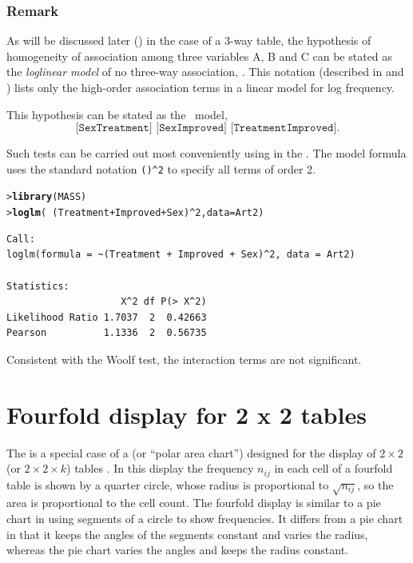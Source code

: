 \documentclass[10pt,krantz2]{krantz}\usepackage[]{graphicx}\usepackage[]{color}
\makeatletter
\newcommand{\hlnum}[1]{\textcolor[rgb]{0.686,0.059,0.569}{#1}}%
\newcommand{\hlopt}[1]{\textcolor[rgb]{0,0,0}{#1}}%
\newcommand{\hlstd}[1]{\textcolor[rgb]{0.345,0.345,0.345}{#1}}%
\newcommand{\hlkwc}[1]{\textcolor[rgb]{0.333,0.667,0.333}{#1}}%
\newcommand{\hlkwd}[1]{\textcolor[rgb]{0.737,0.353,0.396}{\textbf{#1}}}%
\newenvironment{kframe}{%
 \def\at@end@of@kframe{}%
 \ifinner\ifhmode%
  \def\at@end@of@kframe{\end{minipage}}%
  \begin{minipage}{\columnwidth}%
 \fi\fi%
 \def\FrameCommand##1{\hskip\@totalleftmargin \hskip-\fboxsep
 \colorbox{shadecolor}{##1}\hskip-\fboxsep
     \hskip-\linewidth \hskip-\@totalleftmargin \hskip\columnwidth}%
 \MakeFramed {\advance\hsize-\width
   \@totalleftmargin\z@ \linewidth\hsize
   \@setminipage}}%
 {\par\unskip\endMakeFramed%
 \at@end@of@kframe}
\newenvironment{knitrout}{}{} %
\renewenvironment{knitrout}{\small\renewcommand{\baselinestretch}{.85}}{} %
\makeatother
\begin{document}
\subsubsection*{Remark}
As will be discussed later ()
in the case of a 3-way table, the hypothesis of homogeneity of
association among three variables A, B and C can be stated as the
\emph{loglinear model} of no three-way association,
.
This notation (described in  and )
lists only the high-order association
terms in a linear model for log frequency.

This hypothesis can be stated
as the \loglin\ model,
\begin{equation}\label{eq:STO2}
 \texttt{[SexTreatment] [SexImproved] [TreatmentImproved]}
 \period
\end{equation}

Such tests can be carried out most conveniently using
 in the .  The model formula
uses the standard \R notation \verb|()^2| to specify all
terms of order 2.
\begin{knitrout}
\color{fgcolor}\begin{kframe}
\begin{alltt}
\hlstd{> }\hlkwd{library}\hlstd{(MASS)}
\hlstd{> }\hlkwd{loglm}\hlstd{(}\hlopt{~} \hlstd{(Treatment} \hlopt{+} \hlstd{Improved} \hlopt{+} \hlstd{Sex)}\hlopt{^}\hlnum{2}\hlstd{,} \hlkwc{data} \hlstd{= Art2)}
\end{alltt}
\begin{verbatim}
Call:
loglm(formula = ~(Treatment + Improved + Sex)^2, data = Art2)

Statistics:
                    X^2 df P(> X^2)
Likelihood Ratio 1.7037  2  0.42663
Pearson          1.1336  2  0.56735
\end{verbatim}
\end{kframe}
\end{knitrout}
\noindent Consistent with the Woolf test, the interaction terms are not significant.

\section{Fourfold display for 2 x 2 tables}\label{sec:twoway-fourfold}

The  is a special case of a
 (or ``polar area chart'')
designed for the display of $2 \times 2$ (or $2 \times 2 \times k$)
tables
\citep{Fienberg:75,Friendly:94b,Friendly:94c}.
In this display the frequency
\(n_{ij}\) in each cell of a fourfold table is shown by a quarter
circle, whose radius is proportional to \(\sqrt { n_{ij} }\), so the
area is proportional to the cell count.
The fourfold display
is similar to a pie chart in using segments of
a circle to show frequencies.  It
differs from a pie chart in that it keeps the
angles of the segments constant and varies the radius,
whereas the pie chart varies the angles and keeps the radius constant.
\end{document}
